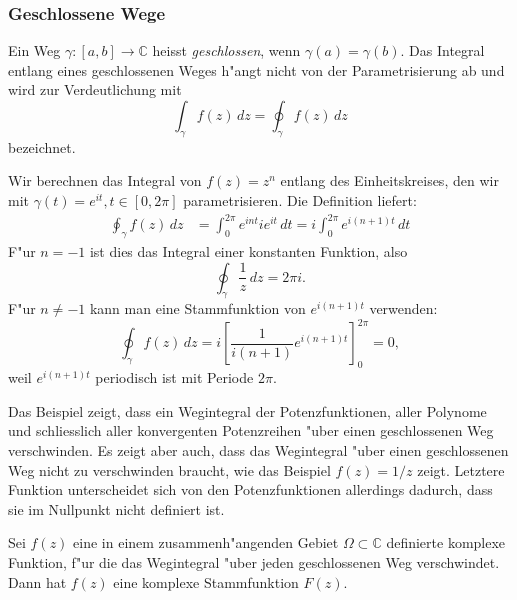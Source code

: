 \subsubsection{Geschlossene Wege}
\begin{definition}
Ein Weg $\gamma\colon[a,b]\to\mathbb C$ heisst {\em geschlossen}, wenn
$\gamma(a)=\gamma(b)$.
Das Integral entlang eines geschlossenen Weges h"angt nicht von der
Parametrisierung ab und wird zur Verdeutlichung mit
\[
\int_{\gamma}f(z)\,dz
=
\oint_{\gamma}f(z)\,dz
\]
bezeichnet.
\end{definition}

\begin{beispiel}
Wir berechnen das Integral von $f(z)=z^n$ entlang des Einheitskreises,
den wir mit $\gamma(t)=e^{it},t\in[0,2\pi]$ parametrisieren.
Die Definition liefert:
\begin{align*}
\oint_{\gamma}f(z)\,dz
&=
\int_0^{2\pi}e^{int}ie^{it}\,dt
=
i\int_0^{2\pi}e^{i(n+1)t}\,dt
\end{align*}
F"ur $n=-1$ ist dies das Integral einer konstanten Funktion, also
\[
\oint_{\gamma}\frac1z\,dz=2\pi i.
\]
F"ur $n\ne -1$ kann man eine Stammfunktion von $e^{i(n+1)t}$
verwenden:
\[
\oint_{\gamma}f(z)\,dz
=
i\left[\frac1{i(n+1)}e^{i(n+1)t}\right]_0^{2\pi}
=0,
\]
weil $e^{i(n+1)t}$ periodisch ist mit Periode $2\pi$.
\end{beispiel}
Das Beispiel zeigt, dass ein Wegintegral der Potenzfunktionen,
aller Polynome und schliesslich aller konvergenten Potenzreihen
"uber einen geschlossenen Weg verschwinden.
Es zeigt aber auch, dass das Wegintegral "uber einen geschlossenen
Weg nicht zu verschwinden braucht, wie das Beispiel $f(z)=1/z$ 
zeigt.
Letztere Funktion unterscheidet sich von den Potenzfunktionen allerdings
dadurch, dass sie im Nullpunkt nicht definiert ist.

\begin{satz}
Sei $f(z)$ eine in einem zusammenh"angenden Gebiet $\Omega\subset\mathbb C$
definierte komplexe Funktion, f"ur die das Wegintegral "uber jeden
geschlossenen Weg verschwindet.
Dann hat $f(z)$ eine komplexe Stammfunktion $F(z)$.
\end{satz}

